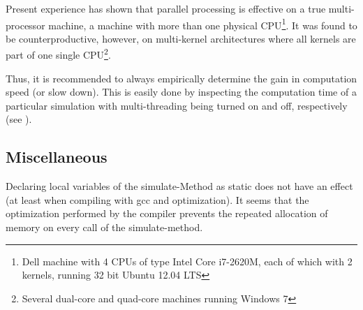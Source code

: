 Present experience has shown that parallel processing is effective on a true multi-processor machine, \ie{} a machine with more than one physical CPU\footnote{Dell machine with 4 CPUs of type Intel Core i7-2620M, each of which with 2 kernels, running 32 bit Ubuntu 12.04 LTS}. It was found to be counterproductive, however, on multi-kernel architectures where all kernels are part of one single CPU\footnote{Several dual-core and quad-core machines running Windows 7}.

Thus, it is recommended to always empirically determine the gain in computation speed (or slow down). This is easily done by inspecting the computation time of a particular simulation with multi-threading being turned on and off, respectively (see ).
  
\subsection{Miscellaneous} \label{sec:guidelines-speedOptim-misc}
Declaring local variables of the simulate-Method as static does not have an effect (at least when compiling with gcc and optimization). It seems that the optimization performed by the compiler prevents the repeated allocation of memory on every call of the simulate-method.
